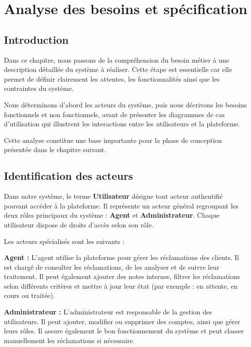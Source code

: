 \documentclass[12pt,a4paper,oneside]{report}
\begin{document}
\chapter{Analyse des besoins et spécification}

\section{Introduction}

Dans ce chapitre, nous passons de la compréhension du besoin métier à une description détaillée du système à réaliser. Cette étape est essentielle car elle permet de définir clairement les attentes, les fonctionnalités ainsi que les contraintes du système.

Nous déterminons d’abord les acteurs du système, puis nous décrivons les besoins fonctionnels et non fonctionnels, avant de présenter les diagrammes de cas d’utilisation qui illustrent les interactions entre les utilisateurs et la plateforme.

Cette analyse constitue une base importante pour la phase de conception présentée dans le chapitre suivant.



\section{Identification des acteurs}

Dans notre système, le terme \textbf{Utilisateur} désigne tout acteur authentifié pouvant accéder à la plateforme. Il représente un acteur général regroupant les deux rôles principaux du système : \textbf{Agent} et \textbf{Administrateur}. Chaque utilisateur dispose de droits d’accès selon son rôle.

Les acteurs spécialisés sont les suivants :

\textbf{Agent :}  
L’agent utilise la plateforme pour gérer les réclamations des clients. Il est chargé de consulter les réclamations, de les analyser et de suivre leur traitement. Il peut également ajouter des notes internes, filtrer les réclamations selon différents critères et mettre à jour leur état (par exemple : en attente, en cours ou traitée).

\textbf{Administrateur :}  
L’administrateur est responsable de la gestion des utilisateurs. Il peut ajouter, modifier ou supprimer des comptes, ainsi que gérer leurs rôles.  
Il assure également le bon fonctionnement du système et peut classer manuellement les réclamations si nécessaire.
\end{document}
